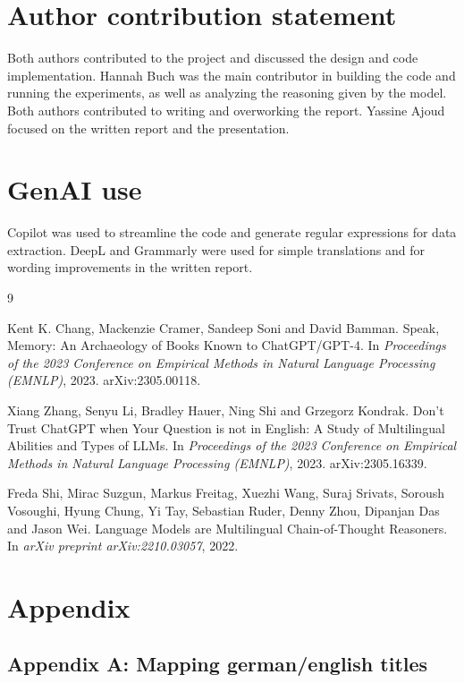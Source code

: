 \documentclass[11pt]{article}
\begin{document}
\newpage

\section*{Author contribution statement}
Both authors contributed to the project and discussed the design and code implementation. Hannah Buch was the main contributor in building the code and running the experiments, as well as analyzing the reasoning given by the model. Both authors contributed to writing and overworking the report. Yassine Ajoud focused on the written report and the presentation.


\section*{GenAI use}
Copilot was used to streamline the code and generate regular expressions for data extraction. DeepL and Grammarly were used for simple translations and for wording improvements in the written report.

\newpage

\begin{thebibliography}{9}

Kent K. Chang, Mackenzie Cramer, Sandeep Soni and David Bamman.
Speak, Memory: An Archaeology of Books Known to ChatGPT/GPT-4.
In \textit{Proceedings of the 2023 Conference on Empirical Methods in
Natural Language Processing (EMNLP)}, 2023. arXiv:2305.00118.

Xiang Zhang, Senyu Li, Bradley Hauer, Ning Shi and Grzegorz Kondrak.
Don't Trust ChatGPT when Your Question is not in English: A Study of
Multilingual Abilities and Types of LLMs.
In \textit{Proceedings of the 2023 Conference on Empirical Methods in
Natural Language Processing (EMNLP)}, 2023. arXiv:2305.16339.

Freda Shi, Mirac Suzgun, Markus Freitag, Xuezhi Wang, Suraj Srivats, Soroush Vosoughi, Hyung Chung, Yi Tay, Sebastian Ruder, Denny Zhou, Dipanjan Das and Jason Wei.
Language Models are Multilingual Chain-of-Thought Reasoners.
In \textit{arXiv preprint arXiv:2210.03057}, 2022.


\end{thebibliography}

\newpage
\section{Appendix}
\subsection{Appendix A: Mapping german/english titles}
\end{document}
